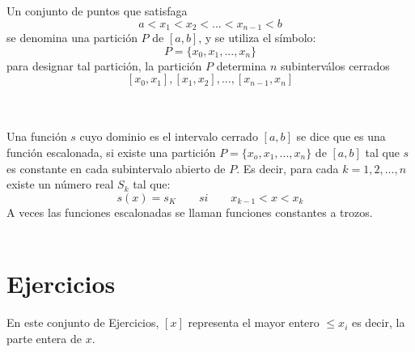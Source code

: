     \begin{tcolorbox}[colframe=white]
	
	\begin{def.}
	    Un conjunto de puntos que satisfaga $$a<x_1 < x_2 < ... < x_{n-1}<b$$ se denomina una partición $P$ de $\left[a,b\right]$, y se utiliza el símbolo: $$P=\lbrace x_0,x_1,...,x_n\rbrace$$ para designar tal partición, la partición $P$ determina $n$ subinterválos cerrados $$\left[x_0,x_1\right], \left[x_1,x_2\right],...,\left[x_{n-1}, x_n\right]$$\\\\
	\end{def.}

	\begin{def.}
	    Una función $s$ cuyo dominio es el intervalo cerrado $\left[a,b\right]$ se dice que es una función escalonada, si existe una partición $P=\lbrace x_o,x_1,...,x_n \rbrace$ de $\left[ a,b \right]$ tal que $s$ es constante en cada subintervalo abierto de $P$. Es decir, para cada $k=1,2,...,n$ existe un número real $S_k$ tal que: $$s(x)=s_K \qquad si \qquad x_{k-1}<x<x_k$$ A veces las funciones escalonadas se llaman funciones constantes a trozos.\\\\
	\end{def.}

    \end{tcolorbox}

\setcounter{section}{10}
\section{Ejercicios}

    En este conjunto de Ejercicios, $\left[x\right]$ representa el mayor entero $\leq x_i$ es decir, la parte entera de $x$.\\

